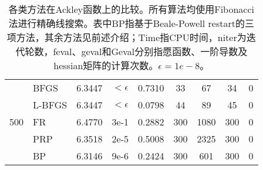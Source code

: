 \documentclass{article}
\begin{document}
\begin{table*}[h]
\begin{tabular}{c l c c c c c c c}
    \cmidrule(lr){1-9}
    \multirow{5}{*}{500} &
    BFGS & 6.3447 & $<\epsilon$ & 0.7310 & 33 & 67 & 34 & 0 \\
    & L-BFGS & 6.3447 & $<\epsilon$ & 0.0798 & 44 & 89 & 45 & 0 \\
    & FR & 6.4770 & 3e-1 & 0.2882 & 300 & 1080 & 300 & 0 \\
    & PRP & 6.3518 & 2e-5 & 0.5008 & 300 & 2325 & 300 & 0 \\
    & BP & 6.3146 & 9e-6 & 0.2424 & 300 & 601 & 300 & 0 \\
    \bottomrule
  \end{tabular}
  \caption{各类方法在Ackley函数上的比较。所有算法均使用Fibonacci法进行精确线搜索。表中BP指基于Beale-Powell restart的三项方法，其余方法见前述介绍；Time指CPU时间，niter为迭代轮数，feval、geval和Geval分别指愿函数、一阶导数及hessian矩阵的计算次数。$\epsilon=1e-8$。}
  \label{tab:ackley}
\end{table*}
\end{document}
